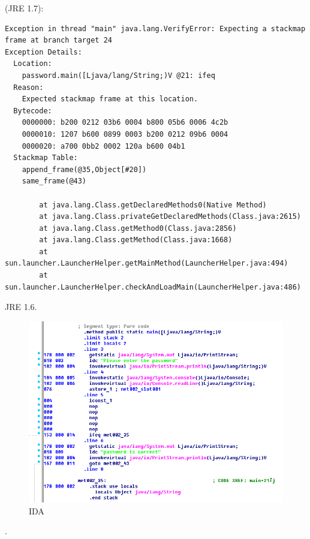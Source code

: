  (JRE 1.7):

\begin{lstlisting}
Exception in thread "main" java.lang.VerifyError: Expecting a stackmap frame at branch target 24
Exception Details:
  Location:
    password.main([Ljava/lang/String;)V @21: ifeq
  Reason:
    Expected stackmap frame at this location.
  Bytecode:
    0000000: b200 0212 03b6 0004 b800 05b6 0006 4c2b
    0000010: 1207 b600 0899 0003 b200 0212 09b6 0004
    0000020: a700 0bb2 0002 120a b600 04b1
  Stackmap Table:
    append_frame(@35,Object[#20])
    same_frame(@43)

        at java.lang.Class.getDeclaredMethods0(Native Method)
        at java.lang.Class.privateGetDeclaredMethods(Class.java:2615)
        at java.lang.Class.getMethod0(Class.java:2856)
        at java.lang.Class.getMethod(Class.java:1668)
        at sun.launcher.LauncherHelper.getMainMethod(LauncherHelper.java:494)
        at sun.launcher.LauncherHelper.checkAndLoadMain(LauncherHelper.java:486)
\end{lstlisting}

 JRE 1.6.



\begin{figure}[H]
\centering
\includegraphics[scale=\FigScale]{Java_and_NET/java/13_patching/2/3.png}
\caption{IDA}
\end{figure}


.
